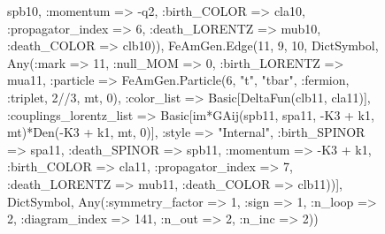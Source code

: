 \documentclass{revtex4}
\begin{document}
\begin{figure}[!htb]
\begin{center}
{spb10, :momentum => -q2, :birth_COLOR => cla10, :propagator_index => 6, :death_LORENTZ => mub10, :death_COLOR => clb10)), FeAmGen.Edge(11, 9, 10, Dict{Symbol, Any}(:mark => 11, :null_MOM => 0, :birth_LORENTZ => mua11, :particle => FeAmGen.Particle(6, "t", "tbar", :fermion, :triplet, 2//3, mt, 0), :color_list => Basic[DeltaFun(clb11, cla11)], :couplings_lorentz_list => Basic[im*GAij(spb11, spa11, -K3 + k1, mt)*Den(-K3 + k1, mt, 0)], :style => "Internal", :birth_SPINOR => spa11, :death_SPINOR => spb11, :momentum => -K3 + k1, :birth_COLOR => cla11, :propagator_index => 7, :death_LORENTZ => mub11, :death_COLOR => clb11))], Dict{Symbol, Any}(:symmetry_factor => 1, :sign => 1, :n_loop => 2, :diagram_index => 141, :n_out => 2, :n_inc => 2)) 
}
\end{center}
\end{figure}
\end{document}
